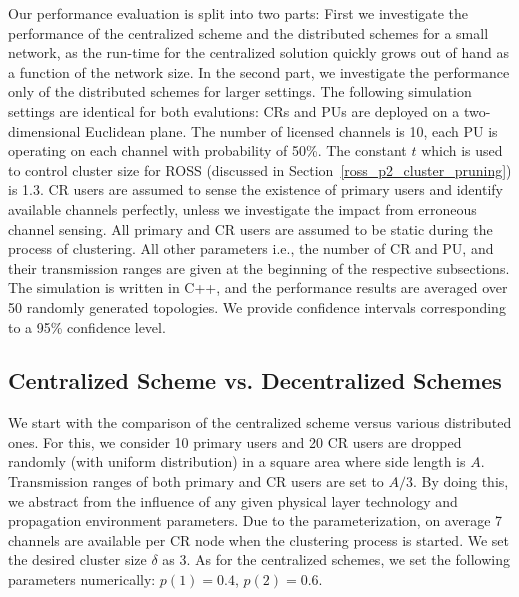 \documentclass[times]{ettauth}
\newcommand{\ie}{i.e., }
\theoremstyle{mytheoremstyle}
\theoremstyle{mytheoremstyle}
\theoremstyle{mytheoremstyle}
\begin{document}
Our performance evaluation is split into two parts:
First we investigate the performance of the centralized scheme and the distributed schemes for a small network, as the run-time for the centralized solution quickly grows out of hand as a function of the network size.
In the second part, we investigate the performance only of the distributed schemes for larger settings.
The following simulation settings are identical for both evalutions:
CRs and PUs are deployed on a two-dimensional Euclidean plane.
The number of licensed channels is 10, each PU is operating on each channel with probability of 50\%.
The constant $t$ which is used to control cluster size for ROSS (discussed in Section~\ref{ross_p2_cluster_pruning}) is 1.3.
CR users are assumed to sense the existence of primary users and identify available channels perfectly, unless we investigate the impact from erroneous channel sensing.
All primary and CR users are assumed to be static during the process of clustering.
All other parameters \ie the number of CR and PU, and their transmission ranges are given at the beginning of the respective subsections.
The simulation is written in C++, and the performance results are averaged over 50 randomly generated topologies.
We provide confidence intervals corresponding to a 95\% confidence level.

\subsection{Centralized Scheme vs. Decentralized Schemes}
We start with the comparison of the centralized scheme versus various distributed ones.
For this, we consider 10 primary users and 20 CR users are dropped randomly (with uniform distribution) in a square area where side length is $A$.
Transmission ranges of both primary and CR users are set to $A/3$.
By doing this, we abstract from the influence of any given physical layer technology and propagation environment parameters.
Due to the parameterization, on average 7 channels are available per CR node when the clustering process is started.
We set the desired cluster size $\delta$ as 3.
As for the centralized schemes, we set the following parameters numerically: $p(1) =  0.4$, $p(2) =  0.6$.
\end{document}
